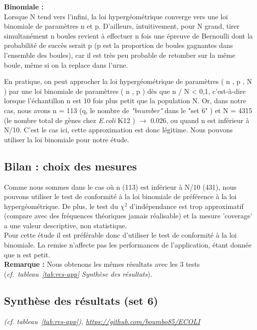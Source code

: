 \documentclass[a4paper,11pt,openright]{report}
\begin{document}
\textbf{Binomiale : } \\
Lorsque N tend vers l'infini, la loi hypergéométrique converge vers une loi binomiale de paramètres n  et p. D'ailleurs, intuitivement, pour N grand, tirer simultanément n boules revient à effectuer n fois une épreuve de Bernoulli dont la probabilité de succès serait p (p est la proportion de boules gagnantes dans l'ensemble des boules), car il est très peu probable de retomber sur la même boule, même si on la replace dans l'urne.

En pratique, on peut approcher la loi hypergéométrique de paramètres ( n , p , N )  par une loi binomiale de paramètres ( n , p ) dès que n / N < 0,1, c'est-à-dire lorsque l'échantillon n est 10 fois plus petit que la population N. Or, dans notre cas, nous avons n = 113 (q, le nombre de \textit{"bnumber"} dans le "set 6" ) et N = 4315 (le nombre total de gènes chez \textit{E.coli} K12 ) $\rightarrow$ 0.026, ou quand n est inférieur à N/10. C'est le cas ici, cette approximation est donc légitime. Nous pouvons utiliser la loi binomiale pour notre étude.

		\subsection{Bilan : choix des mesures}
Comme nous sommes dans le cas où n (113) est inférieur à N/10 (431), nous pouvons utiliser le test de conformité à la loi binomiale de préférence à la loi hypergéométrique. De plus, le test du $\chi^2$ d'indépendance est trop approximatif (compare avec des fréquences théoriques jamais réalisable) et la mesure 'coverage' a une valeur descriptive, non statistique. \\
Pour cette étude il est préférable donc d'utiliser le test de conformité à la loi binomiale. La remise n'affecte pas les performances de l'application, étant donnée que n est petit.\\
\textbf{Remarque :} Nous obtenons les mêmes résultats avec les 3 tests (\textit{cf.~tableau~\ref{tab:res-app} Synthèse des résultats}).

		\subsection{Synthèse des résultats (set 6)}
\textit{(cf. tableau~\ref{tab:res-app}), \url{https://github.com/boumbo85/ECOLI}}


\end{document}
